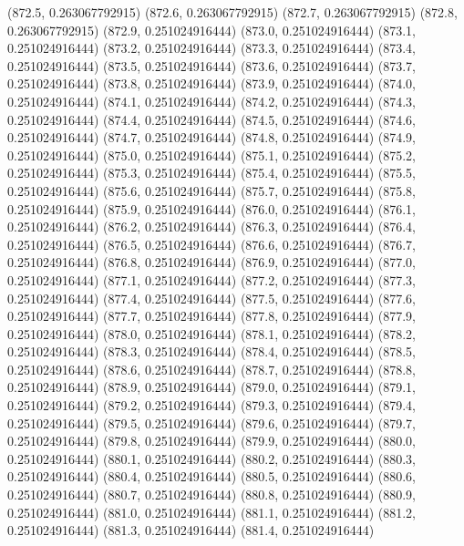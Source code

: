 {					(872.5, 0.263067792915)
					(872.6, 0.263067792915)
					(872.7, 0.263067792915)
					(872.8, 0.263067792915)
					(872.9, 0.251024916444)
					(873.0, 0.251024916444)
					(873.1, 0.251024916444)
					(873.2, 0.251024916444)
					(873.3, 0.251024916444)
					(873.4, 0.251024916444)
					(873.5, 0.251024916444)
					(873.6, 0.251024916444)
					(873.7, 0.251024916444)
					(873.8, 0.251024916444)
					(873.9, 0.251024916444)
					(874.0, 0.251024916444)
					(874.1, 0.251024916444)
					(874.2, 0.251024916444)
					(874.3, 0.251024916444)
					(874.4, 0.251024916444)
					(874.5, 0.251024916444)
					(874.6, 0.251024916444)
					(874.7, 0.251024916444)
					(874.8, 0.251024916444)
					(874.9, 0.251024916444)
					(875.0, 0.251024916444)
					(875.1, 0.251024916444)
					(875.2, 0.251024916444)
					(875.3, 0.251024916444)
					(875.4, 0.251024916444)
					(875.5, 0.251024916444)
					(875.6, 0.251024916444)
					(875.7, 0.251024916444)
					(875.8, 0.251024916444)
					(875.9, 0.251024916444)
					(876.0, 0.251024916444)
					(876.1, 0.251024916444)
					(876.2, 0.251024916444)
					(876.3, 0.251024916444)
					(876.4, 0.251024916444)
					(876.5, 0.251024916444)
					(876.6, 0.251024916444)
					(876.7, 0.251024916444)
					(876.8, 0.251024916444)
					(876.9, 0.251024916444)
					(877.0, 0.251024916444)
					(877.1, 0.251024916444)
					(877.2, 0.251024916444)
					(877.3, 0.251024916444)
					(877.4, 0.251024916444)
					(877.5, 0.251024916444)
					(877.6, 0.251024916444)
					(877.7, 0.251024916444)
					(877.8, 0.251024916444)
					(877.9, 0.251024916444)
					(878.0, 0.251024916444)
					(878.1, 0.251024916444)
					(878.2, 0.251024916444)
					(878.3, 0.251024916444)
					(878.4, 0.251024916444)
					(878.5, 0.251024916444)
					(878.6, 0.251024916444)
					(878.7, 0.251024916444)
					(878.8, 0.251024916444)
					(878.9, 0.251024916444)
					(879.0, 0.251024916444)
					(879.1, 0.251024916444)
					(879.2, 0.251024916444)
					(879.3, 0.251024916444)
					(879.4, 0.251024916444)
					(879.5, 0.251024916444)
					(879.6, 0.251024916444)
					(879.7, 0.251024916444)
					(879.8, 0.251024916444)
					(879.9, 0.251024916444)
					(880.0, 0.251024916444)
					(880.1, 0.251024916444)
					(880.2, 0.251024916444)
					(880.3, 0.251024916444)
					(880.4, 0.251024916444)
					(880.5, 0.251024916444)
					(880.6, 0.251024916444)
					(880.7, 0.251024916444)
					(880.8, 0.251024916444)
					(880.9, 0.251024916444)
					(881.0, 0.251024916444)
					(881.1, 0.251024916444)
					(881.2, 0.251024916444)
					(881.3, 0.251024916444)
					(881.4, 0.251024916444)
}
